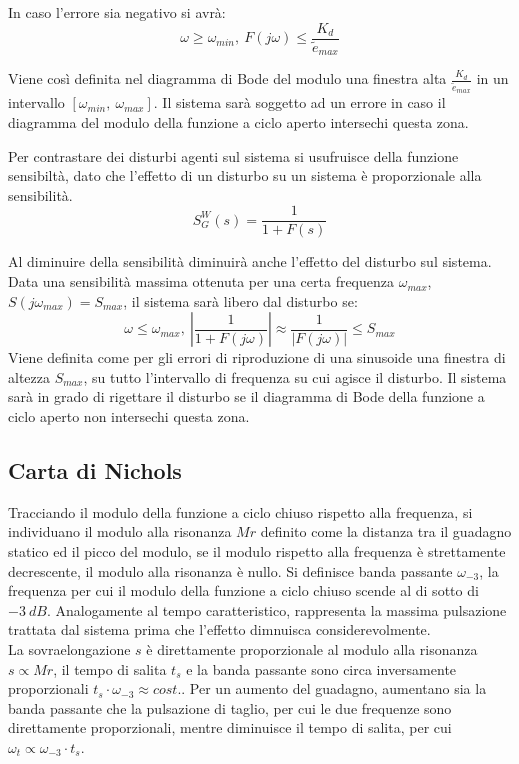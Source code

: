 \documentclass{article}
\numberwithin{equation}{subsection}
\begin{document}
In caso l'errore sia negativo si avrà:
\begin{equation}
    \omega\geq\omega_{min},\:F(j\omega)\leq\displaystyle\frac{K_d}{\tilde{e}_{max}}
\end{equation}

Viene così definita nel diagramma di Bode del modulo una finestra alta $\displaystyle\frac{K_d}{\tilde{e}_{max}}$ in un intervallo $[\omega_{min},\:\omega_{max}]$. 
Il sistema sarà soggetto ad un errore in caso il diagramma del modulo della funzione a ciclo aperto intersechi questa zona. 

 
Per contrastare dei disturbi agenti sul sistema si usufruisce della funzione sensibiltà, dato che l'effetto di un disturbo su un sistema è proporzionale alla sensibilità. 
\begin{equation}
    S^W_G(s)=\displaystyle\frac{1}{1+F(s)}
\end{equation}

Al diminuire della sensibilità diminuirà anche l'effetto del disturbo sul sistema. Data una sensibilità massima ottenuta per una certa frequenza $\omega_{max}$, 
$S(j\omega_{max})=S_{max}$, il sistema sarà libero dal disturbo se: 
\begin{equation}
    \omega\leq\omega_{max},\:\displaystyle\left|\frac{1}{1+F(j\omega)}\right|\approx\frac{1}{|F(j\omega)|}\leq S_{max}
\end{equation}
Viene definita come per gli errori di riproduzione di una sinusoide una finestra di altezza $S_{max}$, su tutto l'intervallo di frequenza su cui agisce il disturbo. Il sistema 
sarà in grado di rigettare il disturbo se il diagramma di Bode della funzione a ciclo aperto non intersechi questa zona. 

\subsection{Carta di Nichols}

Tracciando il modulo della funzione a ciclo chiuso rispetto alla frequenza, si individuano il modulo alla risonanza $Mr$ definito come la distanza tra il guadagno statico 
ed il picco del modulo, se il modulo rispetto alla frequenza è strettamente decrescente, il modulo alla risonanza è nullo. Si definisce banda passante $\omega_{-3}$, la 
frequenza per cui il modulo della funzione a ciclo chiuso scende al di sotto di $-3\:dB$. Analogamente al tempo caratteristico, rappresenta la massima pulsazione trattata dal 
sistema prima che l'effetto dimnuisca considerevolmente. \\
La sovraelongazione $s$ è direttamente proporzionale al modulo alla risonanza $s\propto Mr$, il tempo di salita $t_s$ e la banda passante sono circa inversamente proporzionali 
$t_s\cdot\omega_{-3}\approx cost.$. Per un aumento del guadagno, aumentano sia la banda passante che la pulsazione di taglio, per cui le due frequenze sono direttamente proporzionali, 
mentre diminuisce il tempo di salita, per cui $\omega_t\propto\omega_{-3}\cdot t_s$.
\end{document}
